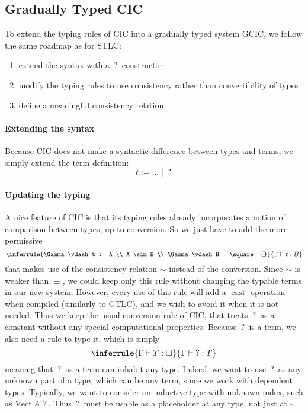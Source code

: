 \documentclass[en]{myarticle}
\renewcommand{\mathtt}{\mathrm}
\newcommand{\uni}[1][]{\square_{#1}}
\newcommand{\cons}{\sim}
\newcommand{\conv}{\equiv}
\DeclareMathOperator{\?}{?}
\newcommand{\ve}{\mathtt{Vect}}
\newcommand{\cas}{\operatorname{\mathtt{cast}}}
\newcommand{\gcic}{GCIC}
\begin{document}
{\subsection{Gradually Typed CIC}
\label{gcicss}


To extend the typing rules of CIC into a gradually typed system \gcic, we follow the same roadmap as for STLC:
\begin{enumerate}
	\item extend the syntax with a $\?$ constructor
	\item modify the typing rules to use consistency rather than convertibility of types
	\item define a meaningful consistency relation
\end{enumerate}

\paragraph{Extending the syntax}

Because CIC does not make a syntactic difference between types and terms, we simply extend the term definition:
\[t := \dots \mid \? \]

\paragraph{Updating the typing}

A nice feature of CIC is that its typing rules already incorporates a notion of comparison between types, up to conversion. So we just have to add the more permissive
\[\inferrule{\Gamma \vdash t : A \\ A \cons B \\ \Gamma \vdash B : \uni}{\Gamma \vdash t : B} \]
that makes use of the consistency relation $\cons$ instead of the conversion. Since $\cons$ is weaker than $\conv$, we could keep only this rule without changing the typable terms in our new system. However, every use of this rule will add a $\cas$ operation when compiled (similarly to GTLC), and we wish to avoid it when it is not needed. Thus we keep the usual conversion rule of CIC, that treats $\?$ as a constant without any special computational properties.
Because $\?$ is a term, we also need a rule to type it, which is simply
\[\inferrule{\Gamma \vdash T : \uni}{\Gamma \vdash \? : T} \]
meaning that $\?$ as a term can inhabit any type. Indeed, we want to use $\?$ as any unknown part of a type, which can be any term, since we work with dependent types. Typically, we want to consider an inductive type with unknown index, such as $\ve~A~\?$. Thus $\?$ must be usable as a placeholder at any type, not just at $\uni$.

}
\end{document}
